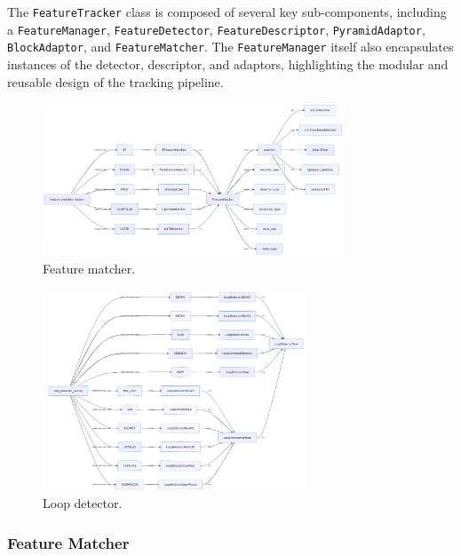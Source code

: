 \documentclass{article}
\begin{document}
The \texttt{FeatureTracker} class is composed of several key sub-components, including a \texttt{FeatureManager}, \texttt{FeatureDetector}, \texttt{FeatureDescriptor}, \texttt{PyramidAdaptor}, \texttt{BlockAdaptor}, and \texttt{FeatureMatcher}. The \texttt{FeatureManager} itself also encapsulates instances of the detector, descriptor, and adaptors, highlighting the modular and reusable design of the tracking pipeline.


\begin{figure}[!t]
\begin{center}
    \includegraphics[width=0.8\textwidth]{./images/feature_matcher.png}
\end{center}
\caption{Feature matcher.}
\label{Fig:FeatureMatcher}
\end{figure}

\begin{figure}[!t]
\begin{center}
    \includegraphics[width=0.7\textwidth]{./images/loop_detector.png}
\end{center}
\caption{Loop detector.}
\label{Fig:LoopDetector}
\end{figure}


\subsubsection{Feature Matcher}\label{Sect:FeatureMatcher}
\end{document}
